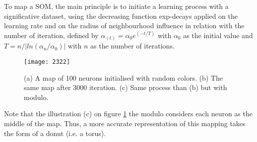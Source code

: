 To map a SOM, the main principle is to initiate a learning process with a significative dataset, using the decreasing function \glspl{exp-decay} applied on the learning rate and on the radius of neighbourhood influence in relation with the number of iteration, defined by $\alpha_{(t)} = \alpha_0 e^{(-t/T)}$ with $\alpha_0$ as the initial value and $T=n/|ln(\alpha_n/\alpha_0)|$ with $n$ as the number of iterations. 

\begin{figure}[htbp]
\begin{center}
\texttt{[image: 2322]}
\caption{(a) A map of 100 neurons initialised with random colors. (b) The same map after 3000 iteration. (c) Same process than (b) but with modulo.}
\label{fig:ex1}
\end{center}
\end{figure}

Note that the illustration (c) on figure \ref{fig:ex1} the modulo considers each neuron as the middle of the map. Thus, a more accurate representation of this mapping takes the form of a donut (i.e. a torus).